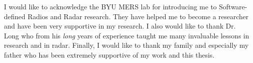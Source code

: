 \begin{acknowledgments}
	I would like to acknowledge the BYU MERS lab for introducing me to Software-defined Radios and Radar research.
	They have helped me to become a researcher and have been very supportive in my research.
	I also would like to thank Dr. Long who from his \textit{long} years of experience
	taught me many invaluable lessons in research and in radar.
	Finally, I would like to thank my family and especially my father who has been extremely supportive
	of my work and this thesis.
	
\end{acknowledgments}

